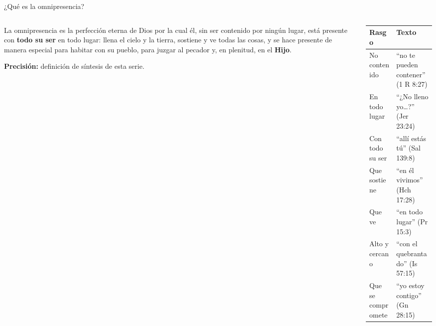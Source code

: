 \documentclass[hyperref={bookmarks=false},aspectratio=169]{beamer}
\newcommand{\destacar}[1]{\textbf{\textcolor{azul}{#1}}}
\newcommand{\precision}[1]{{\footnotesize\color{gris}\textbf{Precisión:} #1}}
\begin{document}
\begin{frame}{¿Qué es la omnipresencia?}
\begin{columns}[c,onlytextwidth]
\begin{column}{0.48\textwidth}
\begin{tcolorbox}[colback=papiro,colframe=azul,boxrule=1pt,arc=3pt,title={\small Definición},colbacktitle=azul,coltitle=papiro]
\small La omnipresencia es la perfección eterna de Dios por la cual él, sin ser contenido por ningún lugar, está presente con \destacar{todo su ser} en todo lugar: llena el cielo y la tierra, sostiene y ve todas las cosas, y se hace presente de manera especial para habitar con su pueblo, para juzgar al pecador y, en plenitud, en el \destacar{Hijo}.
\end{tcolorbox}
\precision{definición de síntesis de esta serie.}
\end{column}
\begin{column}{0.50\textwidth}
\scriptsize\renewcommand{\arraystretch}{1.12}
\begin{tabular}{@{}>{\RaggedRight\arraybackslash}p{1.9cm}>{\RaggedRight\arraybackslash}p{4.3cm}@{}}
\toprule
\textbf{Rasgo} & \textbf{Texto} \\ \midrule
No contenido & ``no te pueden contener'' (1 R 8:27) \\
En todo lugar & ``¿No lleno yo\ldots?'' (Jer 23:24) \\
Con todo su ser & ``allí estás tú'' (Sal 139:8) \\
Que sostiene & ``en él vivimos'' (Hch 17:28) \\
Que ve & ``en todo lugar'' (Pr 15:3) \\
Alto y cercano & ``con el quebrantado'' (Is 57:15) \\
Que se compromete & ``yo estoy contigo'' (Gn 28:15) \\
\bottomrule
\end{tabular}
\end{column}
\end{columns}
\end{frame}
\end{document}
